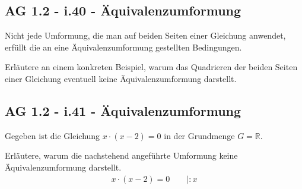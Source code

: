 \documentclass[a4paper,12pt]{article}
\begin{document}
\newpage

\smallskip\begin{minipage}{1\textwidth}
\subsection{AG 1.2 - i.40 - Äquivalenzumformung}\smallskip

\end{minipage}

\begin{beispiel}[AG 1.2]{1}
Nicht jede Umformung, die man auf beiden Seiten einer Gleichung anwendet, erfüllt die an eine Äquivalenzumformung gestellten Bedingungen.

Erläutere an einem konkreten Beispiel, warum das Quadrieren der beiden Seiten einer Gleichung eventuell keine Äquivalenzumformung darstellt.

\end{beispiel}


\newpage

\smallskip\begin{minipage}{1\textwidth}
\subsection{AG 1.2 - i.41 - Äquivalenzumformung}\smallskip

\end{minipage}

\begin{beispiel}[AG 1.2]{1}
Gegeben ist die Gleichung $x\cdot (x-2)=0$ in der Grundmenge $G=\mathbb{R}$.

Erläutere, warum die nachstehend angeführte Umformung keine Äquivalenzumformung darstellt.
\begin{align*}
x\cdot (x-2)=0 \qquad |:x
\end{align*}

\end{beispiel}
\end{document}
